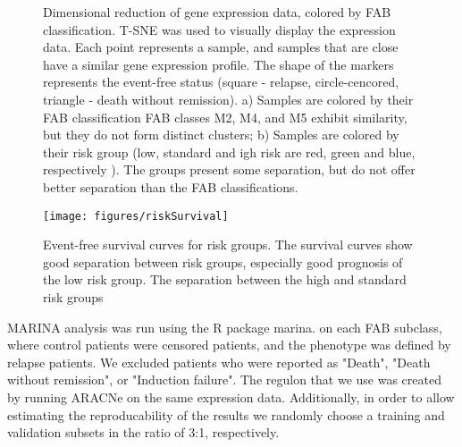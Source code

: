 \documentclass[10pt, letterpaper, twoside, english]{article}
\begin{document}
\begin{figure}
\begin{center}
\end{center}
\caption{Dimensional reduction of gene expression data, colored by FAB classification. 
T-SNE was used to visually display the expression data. 
Each point represents a sample, and samples that are close have a similar gene expression profile.
The shape of the markers represents the event-free 
status (square - relapse, circle-cencored, triangle - death without remission). 
a) Samples are colored by their FAB classification 
FAB classes M2, M4, and M5 exhibit similarity, but they do not form distinct clusters;
b) Samples are colored by their risk group 
(low, standard and igh risk are red, green and blue, respectively ).
The groups present some separation, but do not offer better separation than the FAB classifications.
}
\label{fig:expressionTsne}
\end{figure}

\begin{figure}
\begin{center}
\texttt{[image: figures/riskSurvival]}
\end{center}
\caption{Event-free survival curves for risk groups.
The survival curves show good separation between risk groups, 
especially good prognosis of the low risk group. 
The separation between the high and standard risk groups
}
\label{fig:KMrisk}
\end{figure}

MARINA analysis was run using the R package marina. on each FAB subclass,
where control patients were censored patients, and the phenotype was defined by relapse patients.
We excluded patients who were reported as "Death", "Death without remission", or "Induction failure".
The regulon that we use was created by running ARACNe on the same expression data.
Additionally, in order to allow estimating the reproducability of the results we randomly 
choose a training and validation subsets in the ratio of 3:1, respectively.
\end{document}
